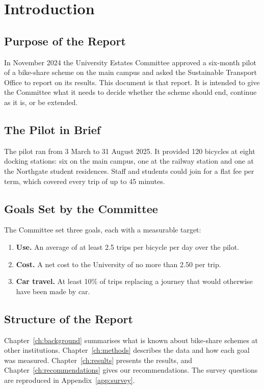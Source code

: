 \chapter{Introduction}\label{ch:introduction}

\section{Purpose of the Report}
In November 2024 the University Estates Committee approved a six-month pilot of a bike-share scheme on the main campus and asked the Sustainable Transport Office to report on its results. This document is that report. It is intended to give the Committee what it needs to decide whether the scheme should end, continue as it is, or be extended.

\section{The Pilot in Brief}
The pilot ran from 3 March to 31 August 2025. It provided 120 bicycles at eight docking stations: six on the main campus, one at the railway station and one at the Northgate student residences. Staff and students could join for a flat fee per term, which covered every trip of up to 45 minutes.

\section{Goals Set by the Committee}\label{sec:goals}
The Committee set three goals, each with a measurable target:
\begin{enumerate}[label=\textbf{G\arabic*}]
  \item \textbf{Use.} An average of at least 2.5 trips per bicycle per day over the pilot.
  \item \textbf{Cost.} A net cost to the University of no more than 2.50 per trip.
  \item \textbf{Car travel.} At least 10\% of trips replacing a journey that would otherwise have been made by car.
\end{enumerate}

\section{Structure of the Report}
Chapter~\ref{ch:background} summarises what is known about bike-share schemes at other institutions. Chapter~\ref{ch:methods} describes the data and how each goal was measured. Chapter~\ref{ch:results} presents the results, and Chapter~\ref{ch:recommendations} gives our recommendations. The survey questions are reproduced in Appendix~\ref{app:survey}.
